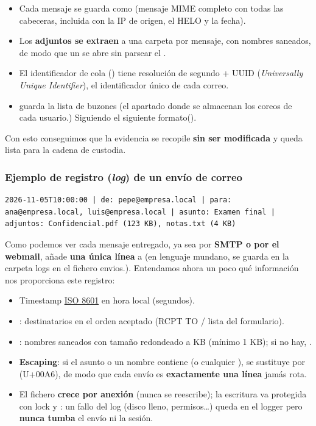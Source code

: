 \begin{itemize}
  \item Cada mensaje se guarda como \textbf{} (mensaje MIME completo
        con todas las cabeceras, incluida  con la IP de origen,
        el HELO y la fecha).
  \item Los \textbf{adjuntos se extraen} a una carpeta por mensaje, con
        nombres saneados, de modo que un  se abre sin parsear el
        .
  \item El identificador de cola () tiene resolución de segundo +
        UUID (\textit{Universally Unique Identifier}), el identificador único de cada correo.
  \item {} guarda la lista de buzones (el apartado donde se almacenan los coreos de cada usuario.) Siguiendo el siguiente formato().
\end{itemize}

Con esto conseguimos que la evidencia se recopile \textbf{sin ser modificada} y queda lista para la cadena de custodia.

\subsubsection{Ejemplo de registro (\textit{log}) de un envío de correo}
\begin{lstlisting}[style=terminal,breaklines=true]
	2026-11-05T10:00:00 | de: pepe@empresa.local | para: ana@empresa.local, luis@empresa.local | asunto: Examen final | adjuntos: Confidencial.pdf (123 KB), notas.txt (4 KB)
\end{lstlisting}

Como podemos ver cada mensaje entregado, ya sea por \textbf{SMTP o por el webmail}, añade \textbf{una única línea} a  (en lenguaje mundano, se guarda en la carpeta logs en el fichero envios.). 
Entendamos ahora un poco qué información nos proporciona este registro:
\begin{itemize}
	\item Timestamp \href{https://www.iso.org/standard/40130.html}{ISO 8601} en hora local (segundos).
	\item {}: destinatarios en el orden aceptado (RCPT TO / lista del
	formulario).
	\item {}: nombres saneados con tamaño redondeado a KB (mínimo
	1 KB); si no hay, .
	\item \textbf{Escaping}: si el asunto o un nombre contiene \cod{ | } (o
	cualquier \cod{|}), se sustituye por \textbrokenbar{} (U+00A6), de
	modo que cada envío es \textbf{exactamente una línea} jamás rota.
	\item El fichero \textbf{crece por anexión} (nunca se reescribe); la
	escritura va protegida con lock y : un fallo del log
	(disco lleno, permisos\ldots) queda en el logger
	 pero \textbf{nunca tumba} el envío ni la
	sesión.
\end{itemize}

